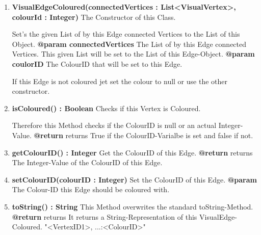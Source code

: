 				\begin{enumerate}[+]
					\item{
						\textbf{VisualEdgeColoured(connectedVertices : List<VisualVertex>, colourId : Integer)} \newline
							The Constructor of this Class.
							
							Set's the given List of by this Edge connected Vertices to the List of this Object.
						\newline
						\textbf{@param connectedVertices}
							The List of by this Edge connected Vertices.
							This given List will be set to the List of this Edge-Object.
							\newline
						\textbf{@param coulorID}
							The ColourID that will be set to this Edge.
							
							If this Edge is not coloured jet set the colour to null or use the other constructor.
					}
					\item{
						\textbf{isColoured() : Boolean} \newline
						Checks if this Vertex is Coloured.
						
						Therefore this Method checks if the ColourID is null or an actual Integer-Value.
						\newline
						\textbf{@return} returns
						True if the ColourID-Varialbe is set and false if not.
						\newline
					}
					\item{
						\textbf{getColourID() : Integer} \newline
						Get the ColourID of this Edge.
						\newline
						\textbf{@return} returns
						The Integer-Value of the ColourID of this Edge.
						\newline
					}
					\item{
						\textbf{setColourID(colourID : Integer)} \newline
						Set the ColourID of this Edge.
						\newline
						\textbf{@param}
							The Colour-ID this Edge should be coloured with.
							\newline
					}
					\item{
						\textbf{toString() : String} \newline
						This Method overwrites the standard toString-Method.
						\newline
						\textbf{@return} returns
							It returns a String-Representation of this VisualEdge-Coloured.
							"{<VertexID1>, ...}:<ColourID>"
							\newline
					}
				\end{enumerate}
			
